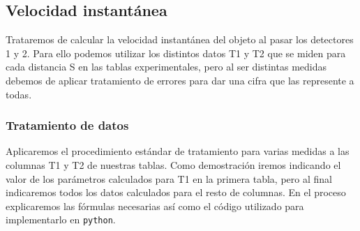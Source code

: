 \documentclass[12pt, a4paper, titlepage]{article}
\newcommand{\code}[1]{\texttt{#1}} %
\begin{document}
  \subsection{Velocidad instantánea}

  Trataremos de calcular la velocidad instantánea del objeto al pasar los detectores 1 y 2. Para ello podemos utilizar los distintos datos T1 y T2 que se miden para cada distancia S en las tablas experimentales, pero al ser distintas medidas debemos de aplicar tratamiento de errores para dar una cifra que las represente a todas.

  \subsubsection{Tratamiento de datos}
  \label{s:tratamientodatos}

  Aplicaremos el procedimiento estándar de tratamiento para varias medidas a las columnas T1 y T2 de nuestras tablas. Como demostración iremos indicando el valor de los parámetros calculados para T1 en la primera tabla, pero al final indicaremos todos los datos calculados para el resto de columnas. En el proceso explicaremos las fórmulas necesarias así como el código utilizado para implementarlo en \code{python}.
\end{document}
